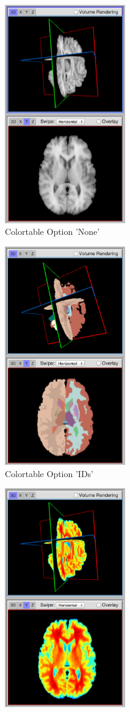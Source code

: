 \documentclass[a4paper,11pt,twoside]{article}
\begin{document}
\begin{figure}
\centering
\begin{subfigure}{.33\textwidth}
  \centering
  \includegraphics[width=52mm]{graphics/ColortableB_02.png}
  \caption{Colortable Option 'None'}
\end{subfigure}%
\begin{subfigure}{.33\textwidth}
  \centering
  \includegraphics[width=52mm]{graphics/ColortableB_01.png}
  \caption{Colortable Option 'IDs'}
\end{subfigure}
\begin{subfigure}{.33\textwidth}
  \centering
  \includegraphics[width=52mm]{graphics/ColortableB_03.png}

\end{subfigure}
\end{figure}
\end{document}
